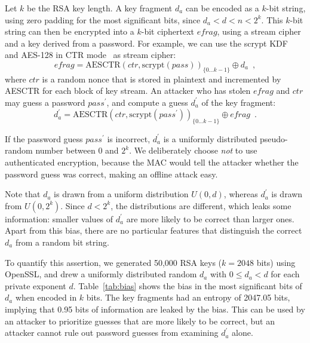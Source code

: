 \documentclass{llncs}
\begin{document}
Let $k$ be the RSA key length. A key fragment $d_a$ can be encoded as a $k$-bit string, using zero
padding for the most significant bits, since $d_a < d < n < 2^k$. This $k$-bit string can then be
encrypted into a $k$-bit ciphertext $\mathit{efrag}$, using a stream cipher and a key derived from a
password. For example, we can use the scrypt KDF~\cite{Percival09} and AES-128 in CTR
mode~\cite{Lipmaa00} as stream cipher:
\begin{equation}\label{eq:encrypt}
\mathit{efrag} =
    \mathrm{AESCTR}(\mathit{ctr}, \mathrm{scrypt}(\mathit{pass}))_{\{0 \dots k-1\}} \oplus d_a
    \enspace,
\end{equation}
where $\mathit{ctr}$ is a random nonce that is stored in plaintext and incremented by AESCTR for
each block of key stream. An attacker who has stolen $\mathit{efrag}$ and $\mathit{ctr}$ may guess a
password $\mathit{pass}^\prime$, and compute a guess $d_a^\prime$ of the key fragment:
\begin{equation}\label{eq:decrypt}
d_a^\prime =
    \mathrm{AESCTR}(\mathit{ctr}, \mathrm{scrypt}(\mathit{pass}^\prime))_{\{0 \dots k-1\}} \oplus \mathit{efrag}
    \enspace.
\end{equation}

If the password guess $\mathit{pass}^\prime$ is incorrect, $d_a^\prime$ is a uniformly distributed
pseudo-random number between 0 and $2^k$. We deliberately choose \emph{not} to use authenticated
encryption, because the MAC would tell the attacker whether the password guess was correct, making
an offline attack easy.

Note that $d_a$ is drawn from a uniform distribution $U(0, d)$, whereas $d_a^\prime$ is drawn from
$U(0, 2^k)$. Since $d < 2^k$, the distributions are different, which leaks some information: smaller
values of $d_a^\prime$ are more likely to be correct than larger ones. Apart from this bias, there
are no particular features that distinguish the correct $d_a$ from a random bit string.

To quantify this assertion, we generated 50,000 RSA keys ($k=2048$ bits) using OpenSSL, and drew a
uniformly distributed random $d_a$ with $0 \le d_a < d$ for each private exponent $d$.
Table~\ref{tab:bias} shows the bias in the most significant bits of $d_a$ when encoded in $k$ bits.
The key fragments had an entropy of 2047.05 bits, implying that 0.95 bits of information are leaked
by the bias. This can be used by an attacker to prioritize guesses that are more likely to be
correct, but an attacker cannot rule out password guesses from examining $d_a^\prime$ alone.
\end{document}
